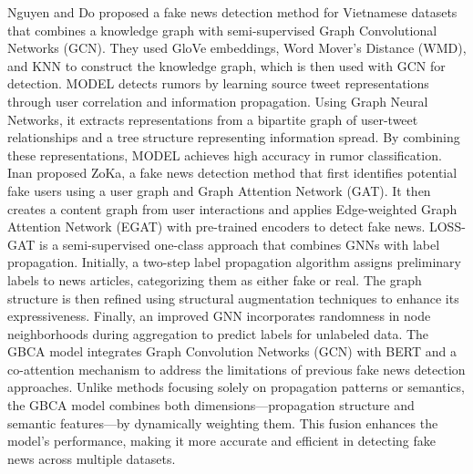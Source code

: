 Nguyen and Do \cite{nguyen2023fake} proposed a fake news detection method for Vietnamese datasets that combines a knowledge graph with semi-supervised Graph Convolutional Networks (GCN). They used GloVe embeddings, Word Mover’s Distance (WMD), and KNN to construct the knowledge graph, which is then used with GCN for detection.
MODEL \cite{liu2024rumor} detects rumors by learning source tweet representations through user correlation and information propagation. Using Graph Neural Networks, it extracts representations from a bipartite graph of user-tweet relationships and a tree structure representing information spread. By combining these representations, MODEL achieves high accuracy in rumor classification.
Inan \cite{inan2022zoka} proposed ZoKa, a fake news detection method that first identifies potential fake users using a user graph and Graph Attention Network (GAT). It then creates a content graph from user interactions and applies Edge-weighted Graph Attention Network (EGAT) with pre-trained encoders to detect fake news.
LOSS-GAT \cite{lakzaei2024loss} is a semi-supervised one-class approach that combines GNNs with label propagation. Initially, a two-step label propagation algorithm assigns preliminary labels to news articles, categorizing them as either fake or real. The graph structure is then refined using structural augmentation techniques to enhance its expressiveness. Finally, an improved GNN incorporates randomness in node neighborhoods during aggregation to predict labels for unlabeled data.
The GBCA model \cite{zhang2024gbca} integrates Graph Convolution Networks (GCN) with BERT and a co-attention mechanism to address the limitations of previous fake news detection approaches. Unlike methods focusing solely on propagation patterns or semantics, the GBCA model combines both dimensions—propagation structure and semantic features—by dynamically weighting them. This fusion enhances the model's performance, making it more accurate and efficient in detecting fake news across multiple datasets.

